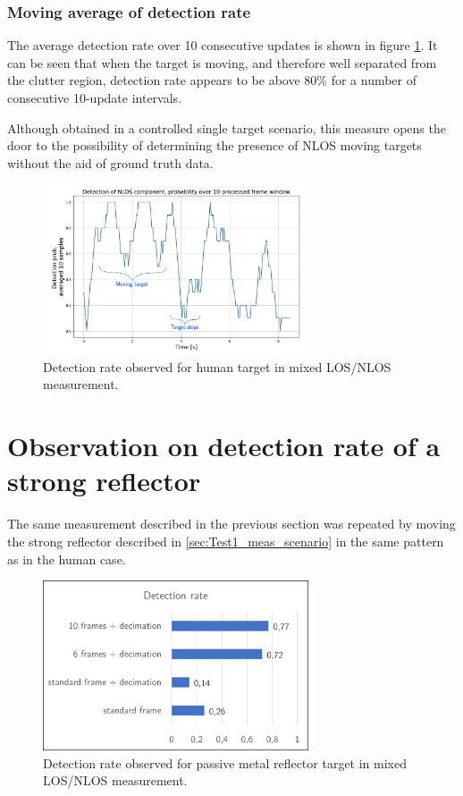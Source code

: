 \subsubsection{Moving average of detection rate}


The average detection rate over 10 consecutive updates is shown in figure \ref{fig:Test1_moving_avg}. It can be seen that when the target is moving, and therefore  well separated from the clutter region, detection rate appears to be above 80\% for a number of consecutive 10-update intervals.

Although obtained in a controlled single target scenario, this measure opens the door to the possibility of determining the presence of NLOS moving targets without the aid of ground truth data.


\begin{figure}[H]
	\centering
	\includegraphics[width=0.7\textwidth]{Images/Test1/moving_avg-transformed_wtext}
	\caption{Detection rate observed for human target in mixed LOS/NLOS measurement.}
	\label{fig:Test1_moving_avg}
\end{figure}

\section{Observation on detection rate of a strong reflector}

The same measurement described in the previous section was repeated by moving the strong reflector described in \ref{sec:Test1_meas_scenario} in the same pattern as in the human case.

\begin{figure}[H]
	\centering
	\includegraphics[width=0.7\textwidth]{Images/Test1/detect_hist_strong_ref.png}
	\caption{Detection rate observed for passive metal reflector target in mixed LOS/NLOS measurement.}
	\label{fig:Test1_detect_rate_strong_ref}
\end{figure}

